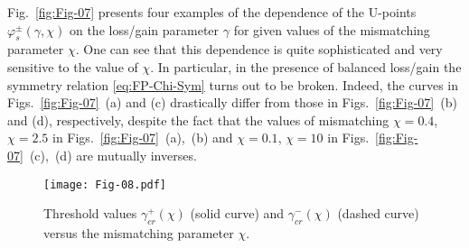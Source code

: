 \documentclass[aps,pra,reprint,showpacs,bibnotes,preprintnumbers,twoside,eqsecnum]{revtex4-1}
\begin{document}
Fig.~\ref{fig:Fig-07} presents four examples of the dependence of the U-points $\varphi_s^{\pm}(\gamma,\chi)$ on the loss/gain parameter $\gamma$ for given values of the mismatching parameter $\chi$. One can see that this dependence is quite sophisticated and very sensitive to the value of $\chi$. In particular, in the presence of balanced loss/gain the symmetry relation \eqref{eq:FP-Chi-Sym} turns out to be broken. Indeed, the curves in Figs.~\ref{fig:Fig-07}~(a) and (c) drastically differ from those in Figs.~\ref{fig:Fig-07}~(b) and (d), respectively, despite the fact that the values of mismatching $\chi=0.4$, $\chi=2.5$ in Figs.~\ref{fig:Fig-07}~(a),~(b) and $\chi=0.1$, $\chi=10$ in Figs.~\ref{fig:Fig-07}~(c),~(d) are mutually inverses.

\begin{figure}[t]
\centering
\texttt{[image: Fig-08.pdf]}
\caption{Threshold values $\gamma_{cr}^{+}(\chi)$ (solid curve) and $\gamma_{cr}^{-}(\chi)$ (dashed curve) versus the mismatching parameter $\chi$.}\label{fig:Fig-08}
\end{figure}
\end{document}
